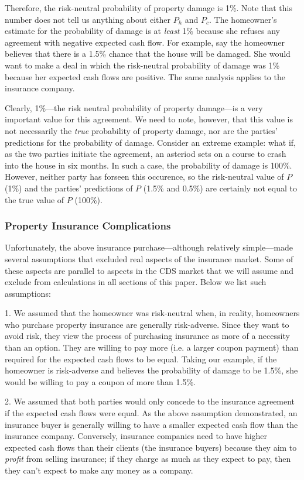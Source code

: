 \documentclass{jss}
\begin{document}
Therefore, the risk-neutral probability of property damage is 1\%. Note that this number does not tell us anything about either $P_h$ and $P_c$. The homeowner's estimate for the probability of damage is at \emph{least} 1\% because she refuses any agreement with negative expected cash flow. For example, say the homeowner believes that there is a 1.5\% chance that the house will be damaged. She would want to make a deal in which the risk-neutral probability of damage was 1\% because her expected cash flows are positive.  The same analysis applies to the insurance company. 

Clearly, 1\%---the risk neutral probability of property damage---is a very important value for this agreement. We need to note, however, that this value is not necessarily the \emph{true} probability of property damage, nor are the parties' predictions for the probability of damage. Consider an extreme example: what if, as the two parties initiate the agreement, an asteriod sets on a course to crash into the house in six months. In such a case, the probability of damage is 100\%. However, neither party has forseen this occurence, so the risk-neutral value of $P$ (1\%) and the parties' predictions of $P$ (1.5\% and 0.5\%) are certainly not equal to the true value of $P$ (100\%).

\subsubsection{Property Insurance Complications}
\label{sec:PIComplications}

Unfortunately, the above insurance purchase---although relatively simple---made several assumptions that excluded real aspects of the insurance market. Some of these aspects are parallel to aspects in the CDS market that we will assume and exclude from calculations in all sections of this paper. Below we list such assumptions:

1. We assumed that the homeowner was risk-neutral when, in reality, homeowners who purchase property insurance are generally risk-adverse. Since they want to avoid risk, they view the process of purchasing insurance as more of a necessity than an option. They are willing to pay more (i.e. a larger coupon payment) than required for the expected cash flows to be equal. Taking our example, if the homeowner is risk-adverse and believes the probability of damage to be 1.5\%, she would be willing to pay a coupon of more than 1.5\%.

2. We assumed that both parties would only concede to the insurance agreement if the expected cash flows were equal. As the above assumption demonstrated, an insurance buyer is generally willing to have a smaller expected cash flow than the insurance company. Conversely, insurance companies need to have higher expected cash flows than their clients (the insurance buyers) because they aim to \emph{profit} from selling insurance; if they charge as much as they expect to pay, then they can't expect to make any money as a company. 
\end{document}
